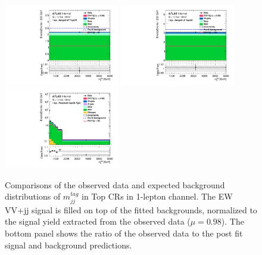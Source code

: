 \begin{figure}[]
    \centering
    \includegraphics[width=0.45\textwidth]{figures/PostFit/Region_disttagMjj_DCRTopHP_BMin0_J0_incJet1_L1_T0_incFat1_Y6051_incTag1_Fat1_GlobalFit_unconditionnal_mu1}
    \includegraphics[width=0.45\textwidth]{figures/PostFit/Region_disttagMjj_DCRTopLP_BMin0_J0_incJet1_L1_T0_incFat1_Y6051_incTag1_Fat1_GlobalFit_unconditionnal_mu1}
    \includegraphics[width=0.45\textwidth]{figures/PostFit/Region_disttagMjj_DCRTopTight_BMin0_T0_Y6051_incTag1_J2_L1_incJet1_GlobalFit_unconditionnal_mu1log} 
    \caption{Comparisons of the observed data and expected background distributions of $m^{tag}_{jj}$ in Top CRs in 1-lepton channel.  The EW VV+jj signal is filled on top of the fitted backgrounds, normalized to the signal yield extracted from the observed data ($\mu = 0.98$). The bottom panel shows the ratio of the observed data to the post fit signal and background predictions.}
    \label{fig:postCRTop}
\end{figure}

